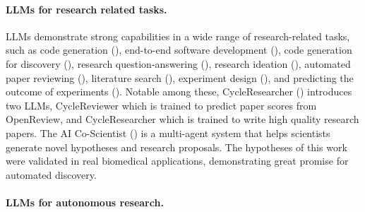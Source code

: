 \documentclass[11pt, a4paper]{include/gdm_format}
\begin{document}
\paragraph{LLMs for research related tasks.}
LLMs demonstrate strong capabilities in a wide range of research-related tasks, such as code generation (\cite{chen2021evaluating, nijkamp2022codegen}), end-to-end software development (\cite{qian2024chatdev, qian2023experiential, phan2024hyperagent, hai2024repoexec}), code generation for discovery (\cite{majumder2024discoverybench, ifargan2024autonomous, hu2024infiagent, guo2024ds, gu2024blade, ghafarollahi2024protagents, chen2024scienceagentbench}), research question-answering (\cite{chen2024scholarchemqa, lala2023paperqa, song2024cs, lin2024biokgbench}), research ideation (\cite{ghafarollahi2024sciagents, li2024chain, si2024can, baek2024researchagent}), automated paper reviewing (\cite{d2024marg, liang2024can, lu2024aiscientist, weng2024cycleresearcher, baek2024researchagent}), literature search (\cite{ajith2024litsearch, kang2024researcharena, press2024citeme, li2024scilitllm, baek2024researchagent, gottweis2025aicoscientist}), experiment design (\cite{baek2024researchagent}), and predicting the outcome of experiments (\cite{luo2024large, ashokkumar2024predicting, lehr2024chatgpt, manning2024automated, zhang2024massw}). Notable among these, CycleResearcher (\cite{weng2024cycleresearcher}) introduces two LLMs, CycleReviewer which is trained to predict paper scores from OpenReview, and CycleResearcher which is trained to write high quality research papers. The AI Co-Scientist (\cite{gottweis2025aicoscientist}) is a multi-agent system that helps scientists generate novel hypotheses and research proposals. The hypotheses of this work were validated in real biomedical applications, demonstrating great promise for automated discovery. 


\paragraph{LLMs for autonomous research.}
\end{document}
